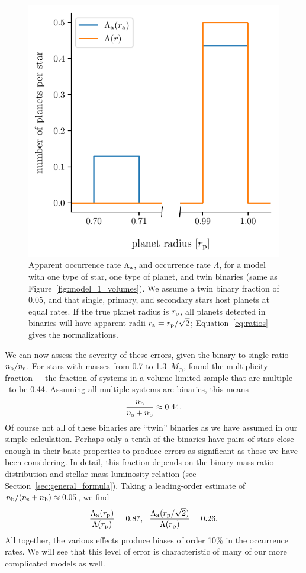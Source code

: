 \documentclass[12pt,modern]{aastex61}
\renewcommand{\a}{_{\rm a}}
\newcommand{\s}{_{\rm s}}
\newcommand{\p}{_{\rm p}}
\renewcommand{\b}{_{\rm b}}
\begin{document}
\begin{figure}[!tb]
    \begin{center}
        \includegraphics[width=.6\textwidth]{figures/occ_rate_vs_radius_model_1_brokenx.pdf}
    \end{center}
    \vspace{-0.5cm}
    \caption{
        Apparent occurrence rate $\Lambda\a$, and occurrence rate $\Lambda$, 
        for a model with one type of star, one
        type of planet, and twin binaries (same as
        Figure~\ref{fig:model_1_volumes}).  We assume a twin binary
        fraction of $0.05$, and that single, primary, and secondary
        stars host planets at equal rates.  If the true planet radius
        is $r\p$, all planets detected in binaries will have apparent
        radii $r\a = r\p/\sqrt{2}$; Equation~\ref{eq:ratios} gives the
        normalizations.
    }
    \label{fig:occ_rate_model_1}
\end{figure}

We can now assess the severity of these errors, given the
binary-to-single ratio $n\b/n\s$. For stars with masses from 0.7 to
1.3~$M_\odot$, \citet{raghavan_survey_2010} found the multiplicity
fraction~--~the fraction of systems in a volume-limited sample that
are multiple~--~to be 0.44.  Assuming all multiple systems are
binaries, this means
\begin{equation}
    \frac{n\b}{n\s + n\b} \approx 0.44.
\end{equation}
Of course not all of these binaries are ``twin'' binaries as we have
assumed in our simple calculation. Perhaps only a tenth of the
binaries have pairs of stars close enough in their basic properties to
produce errors as significant as those we have been considering. In
detail, this fraction depends on the binary mass ratio distribution
and stellar mass-luminosity relation (see
Section~\ref{sec:general_formula}).  Taking a leading-order estimate
of $n\b/(n\s+n\b)\approx0.05$, we find
\begin{equation}
    \frac{\Lambda\a(r\p)}{\Lambda(r\p)} = 0.87,~~
    \frac{\Lambda\a(r\p/\sqrt{2})}{\Lambda(r\p)} = 0.26.
    \label{eq:ratios}
\end{equation}
All together, the various effects produce biases of order 10\% in the
occurrence rates.  We will see that this level of error is
characteristic of many of our more complicated models as well.
\end{document}
